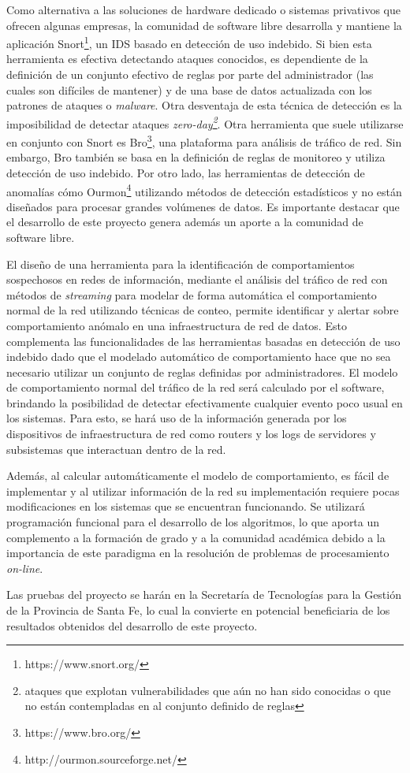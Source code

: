 Como alternativa a las soluciones de hardware dedicado o sistemas privativos que ofrecen algunas empresas, la comunidad de software libre desarrolla y mantiene la aplicación Snort\footnote{https://www.snort.org/}, un IDS basado en detección de uso indebido. Si bien esta herramienta es efectiva detectando ataques conocidos, es dependiente de la definición de un conjunto efectivo de reglas por parte del administrador (las cuales son difíciles de mantener) y de una base de datos actualizada con los patrones de ataques o \textit{malware}. Otra desventaja de esta técnica de detección es la imposibilidad de detectar ataques \textit{zero-day\footnote{ataques que explotan vulnerabilidades que aún no han sido conocidas o que no están contempladas en al conjunto definido de reglas}}\cite{Milenkoski:2015:ECI:2808687.2808691}. Otra herramienta que suele utilizarse en conjunto con Snort es Bro\footnote{https://www.bro.org/}, una plataforma para análisis de tráfico de red. Sin embargo, Bro también se basa en la definición de reglas de monitoreo y utiliza detección de uso indebido. Por otro lado, las herramientas de detección de anomalías cómo Ourmon\footnote{http://ourmon.sourceforge.net/} utilizando métodos de detección estadísticos y no están diseñados para procesar grandes volúmenes de datos. Es importante destacar que el desarrollo de este proyecto genera además un aporte a la comunidad de software libre. \par

El diseño de una herramienta para la identificación de comportamientos sospechosos en redes de información, mediante el análisis del tráfico de red con métodos de \textit{streaming} para modelar de forma automática el comportamiento normal de la red utilizando técnicas de conteo, permite identificar y alertar sobre comportamiento anómalo en una infraestructura de red de datos. Esto complementa las funcionalidades de las herramientas basadas en detección de uso indebido dado que el modelado automático de comportamiento hace que no sea necesario utilizar un conjunto de reglas definidas por administradores. El modelo de comportamiento normal del tráfico de la red será calculado por el software, brindando la posibilidad de detectar efectivamente cualquier evento poco usual en los sistemas. Para esto, se hará uso de la información generada por los dispositivos de infraestructura de red como routers y los logs de servidores y subsistemas que interactuan dentro de la red. \par
Además, al calcular automáticamente el modelo de comportamiento, es fácil de implementar y al utilizar información de la red su implementación requiere pocas modificaciones en los sistemas que se encuentran funcionando. Se utilizará programación funcional para el desarrollo de los algoritmos, lo que aporta un complemento a la formación de grado y a la comunidad académica debido a la importancia de este paradigma en la resolución de problemas de procesamiento \textit{on-line}. \par
Las pruebas del proyecto se harán en la Secretaría de Tecnologías para la Gestión de la Provincia de Santa Fe, lo cual la convierte en potencial beneficiaria de los resultados obtenidos del desarrollo de este proyecto.  \par


